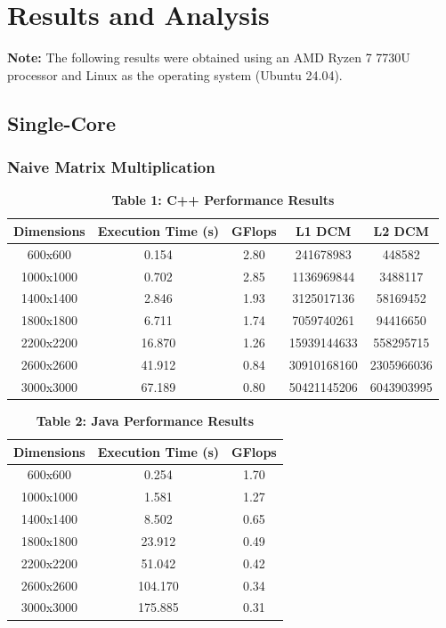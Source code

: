 \documentclass{article}
\begin{document}
\section{Results and Analysis}

\textbf{Note:} The following results were obtained using an AMD Ryzen 7 7730U processor and Linux as the operating system (Ubuntu 24.04).

\subsection{Single-Core}

\subsubsection{Naive Matrix Multiplication}

\begin{table}[H]
\centering
\caption*{\textbf{ Table 1: C++ Performance Results}}
\begin{tabular}{||c | c | c | c | c||} 
 \hline
 \textbf{Dimensions} & \textbf{Execution Time (s)} & \textbf{GFlops} & \textbf{L1 DCM} & \textbf{L2 DCM} \\  
 \hline \hline
 600x600  & 0.154   & 2.80   & 241678983   & 448582    \\  
 \hline
 1000x1000 & 0.702   & 2.85   & 1136969844 & 3488117  \\  
 \hline
 1400x1400 & 2.846   & 1.93   & 3125017136 & 58169452 \\  
 \hline
 1800x1800 & 6.711   & 1.74   & 7059740261 & 94416650 \\  
 \hline
 2200x2200 & 16.870  & 1.26   & 15939144633 & 558295715 \\  
 \hline
 2600x2600 & 41.912  & 0.84   & 30910168160 & 2305966036 \\  
 \hline
 3000x3000 & 67.189  & 0.80   & 50421145206 & 6043903995 \\  
 \hline
\end{tabular}
\end{table}

\begin{table}[H]
\centering
\caption*{\textbf{ Table 2: Java Performance Results}}
\begin{tabular}{||c | c | c||} 
 \hline
 \textbf{Dimensions} & \textbf{Execution Time (s)} & \textbf{GFlops} \\  
 \hline \hline
 600x600  & 0.254   & 1.70   \\  
 \hline
 1000x1000 & 1.581   & 1.27   \\  
 \hline
 1400x1400 & 8.502   & 0.65   \\  
 \hline
 1800x1800 & 23.912  & 0.49   \\  
 \hline
 2200x2200 & 51.042  & 0.42   \\  
 \hline
 2600x2600 & 104.170 & 0.34   \\  
 \hline
 3000x3000 & 175.885 & 0.31   \\  
 \hline
\end{tabular}
\end{table}
\end{document}
